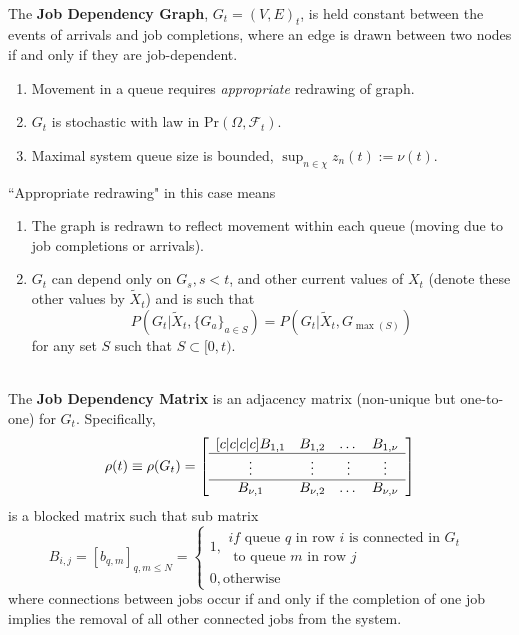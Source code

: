 \begin{definition}
    \hfill \\
    The \textbf{Job Dependency Graph}, $G_{t}=(V,E)_{t}$, is held constant between the events of arrivals and job completions, where an edge is drawn between two nodes if and only if they are job-dependent.

    \begin{enumerate}
        \item Movement in a queue requires \textit{appropriate} redrawing of graph.
        \item $G_{t}$ is stochastic with law in $\text{Pr}(\Omega, \mathcal{F}_{t})$.
        \item Maximal system queue size is bounded, $\sup_{n \in \chi}z_{n}(t):=\nu(t).$
    \end{enumerate}
    ``Appropriate redrawing" in this case means
    \begin{enumerate}
        \item The graph is redrawn to reflect movement within each queue (moving due to job completions or arrivals).
        \item $G_{t}$ can depend only on $G_{s}, s <t$, and other current values of $X_{t}$ (denote these other values by $\tilde X_{t}$) and is such that \[P(G_{t}|\tilde X_{t}, \{G_{a}\}_{a \in S})=P(G_{t}|\tilde X_{t}, G_{\max(S)})\]
        for any set $S$ such that $ S \subset [0,t)$.
    \end{enumerate}
    \label{dep1}
\end{definition}
\begin{definition}
    \hfill \\
    The \textbf{Job Dependency Matrix} is an adjacency matrix (non-unique but one-to-one) for $G_{t}$. Specifically,
    \begin{align}
        \rho(t)\equiv \rho(G_{t})=
        \left[  \enskip
        \begin{matrix}[c|c|c|c]
            B_{1,1}  & B_{1,2}  & \dots & B_{1,\nu}\\
            \hline
            \vdots & \vdots & \vdots &\vdots  \\
            \hline
            B_{\nu,1}  & B_{\nu,2} & \dots   & B_{\nu,\nu}\\
        \end{matrix} \enskip \right]
        \label{rho}
    \end{align}
    is a blocked matrix such that sub matrix
    \[B_{i,j}= [b_{q,m}]_{q,m \leq N} = \begin{cases}
                                            1, \substack{if \text{ queue } q \text{ in row } i \text{ is connected in } G_{t} \\ \text{ to queue } m \text{ in row } j}\\
                                            0, \text{otherwise}
    \end{cases}\]
    where connections between jobs occur if and only if the completion of one job implies the removal of all other connected jobs from the system.
    \label{jdf}
\end{definition}

